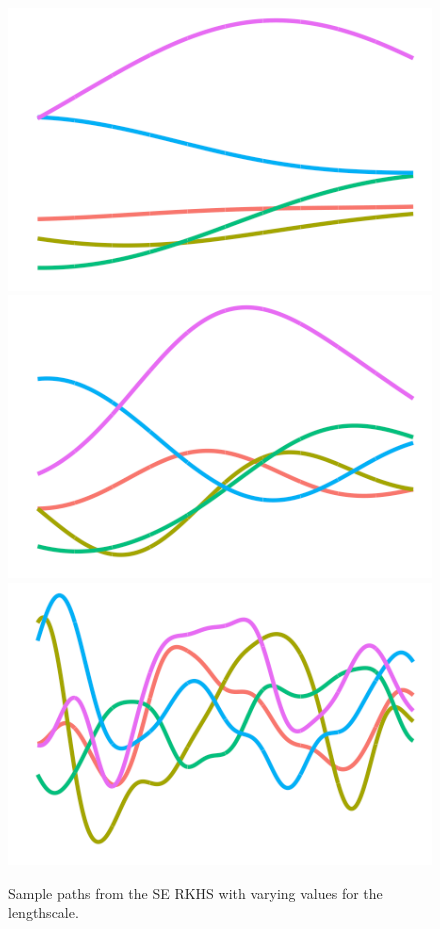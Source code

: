 \begin{figure}[hbt]
  \centering
  \includegraphics[scale=0.4]{figure/kernel_path_se_1_th}
  \includegraphics[scale=0.4]{figure/kernel_path_se_05_th}
  \includegraphics[scale=0.4]{figure/kernel_path_se_01_th}
  \caption{Sample paths from the SE RKHS with varying values for the lengthscale.}
\end{figure}

